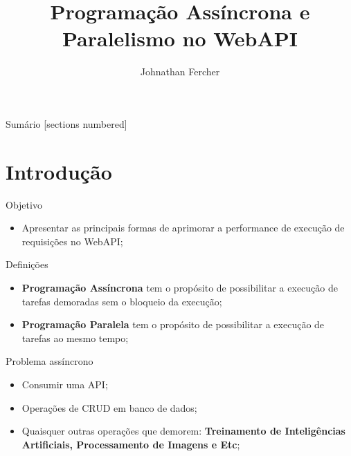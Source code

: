 \documentclass[10pt]{beamer}
\title{Programação Assíncrona e Paralelismo no WebAPI}
\author{Johnathan Fercher}
\begin{document}
\maketitle

\begin{frame}{Sumário}
  [sections numbered]
  \tableofcontents[hideallsubsections]
\end{frame}

\section{Introdução}

\begin{frame}[fragile]{Objetivo}
	\begin{itemize}
		\item Apresentar as principais formas de aprimorar a performance de execução de requisições no WebAPI;
	\end{itemize}
\end{frame}

\begin{frame}[fragile]{Definições}
	\begin{itemize}
		\item \textbf{Programação Assíncrona} tem o propósito de possibilitar a execução de tarefas demoradas sem o bloqueio da execução;
		\vspace{0.2cm}
		\item \textbf{Programação Paralela} tem o propósito de possibilitar a execução de tarefas ao mesmo tempo;
	\end{itemize}
\end{frame}

\begin{frame}[fragile]{Problema assíncrono}
	\begin{itemize}
		\item Consumir uma API;
		\vspace{0.2cm}
		\item Operações de CRUD em banco de dados;
		\vspace{0.2cm}
		\item Quaisquer outras operações que demorem: \textbf{Treinamento de Inteligências Artificiais, Processamento de Imagens e Etc};
	\end{itemize}
\end{frame}
\end{document}
